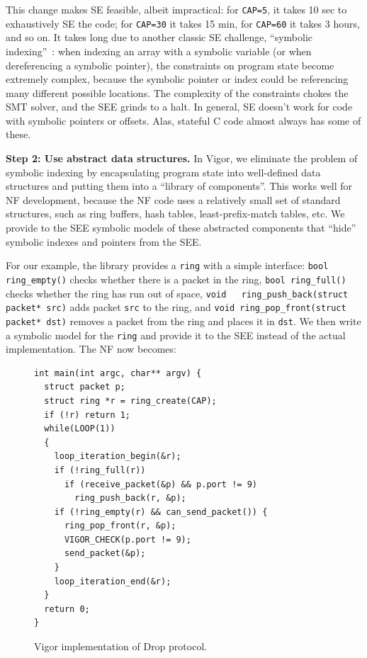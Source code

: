 \documentclass[letterpaper,twocolumn,10pt]{article}
\newcommand{\code}[1]{\lstinline{#1}}
\begin{document}
This change makes SE feasible, albeit impractical: for \code{CAP=5}, it takes 10
sec to exhaustively SE the code; for \code{CAP=30} it takes 15 min, for
\code{CAP=60} it takes 3 hours, and so on. It takes long due to another classic
SE challenge, ``symbolic
indexing''~\cite{sen2005cute,godefroid2008automated,boonstoppel2008rwset}: when
indexing an array with a symbolic variable (or when dereferencing a symbolic
pointer), the constraints on program state become extremely complex, because the
symbolic pointer or index could be referencing many different possible
locations. The complexity of the constraints chokes the SMT solver, and the SEE
grinds to a halt. In general, SE doesn't work for code with symbolic pointers or
offsets. Alas, stateful C code almost always has some of these.

{\bf Step 2: Use abstract data structures.} In Vigor, we eliminate the problem
of symbolic indexing by encapsulating program state into well-defined data
structures and putting them into a ``library of components''. This works well
for NF development, because the NF code uses a relatively small set of standard
structures, such as ring buffers, hash tables, least-prefix-match tables, etc.
We provide to the SEE symbolic models of these abstracted components that
``hide'' symbolic indexes and pointers from the SEE.

For our example, the library provides a \code{ring} with a simple interface:
\code{bool ring_empty()} checks whether there is a packet in the ring,
\code{bool ring_full()} checks whether the ring has run out of space, \code{void
  ring_push_back(struct packet* src)} adds packet \code{src} to the ring, and
\code{void ring_pop_front(struct packet* dst)} removes a packet from the ring
and places it in \code{dst}. We then write a symbolic model for the \code{ring}
and provide it to the SEE instead of the actual implementation. The NF now
becomes:

\begin{figure}[h!]
\begin{lstlisting}
int main(int argc, char** argv) {
  struct packet p;
  struct ring *r = ring_create(CAP);
  if (!r) return 1;
  while(LOOP(1))
  {
    loop_iteration_begin(&r);
    if (!ring_full(r))
      if (receive_packet(&p) && p.port != 9)
        ring_push_back(r, &p);
    if (!ring_empty(r) && can_send_packet()) {
      ring_pop_front(r, &p);
      VIGOR_CHECK(p.port != 9);
      send_packet(&p);
    }
    loop_iteration_end(&r);
  }
  return 0;
}
\end{lstlisting}
  \caption{Vigor implementation of Drop protocol.}
  \label{lst:vigor}
\end{figure}
\end{document}
